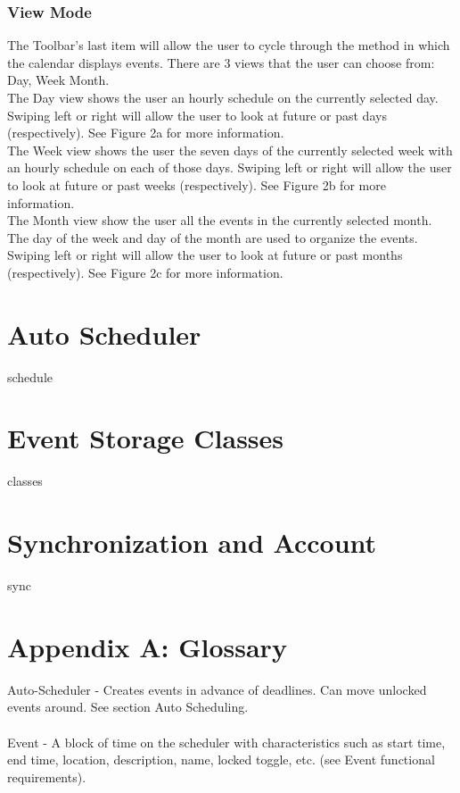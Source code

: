 \documentclass{scrreprt}
\begin{document}
\subsection{View Mode}

The Toolbar's last item will allow the user to cycle through the method in which the calendar displays events.  There are 3 views that the user can choose from: Day, Week Month. \\

The Day view shows the user an hourly schedule on the currently selected day.  Swiping left or right will allow the user to look at future or past days (respectively). See Figure 2a for more information. \\

The Week view shows the user the seven days of the currently selected week with an hourly schedule on each of those days.  Swiping left or right will allow the user to look at future or past weeks (respectively). See Figure 2b for more information. \\

The Month view show the user all the events in the currently selected month.  The day of the week and day of the month are used to organize the events.  Swiping left or right will allow the user to look at future or past months (respectively).  See Figure 2c for more information. \\

\chapter{Auto Scheduler}

schedule

\chapter{Event Storage Classes}

classes

\chapter{Synchronization and Account}

sync

\chapter{Appendix A: Glossary}
Auto-Scheduler - Creates events in advance of deadlines. Can move unlocked events around. See section Auto Scheduling.\\
\\
Event - A block of time on the scheduler with characteristics such as start time, end time,
location, description, name, locked toggle, etc. (see Event functional requirements).\\
\\
\end{document}
